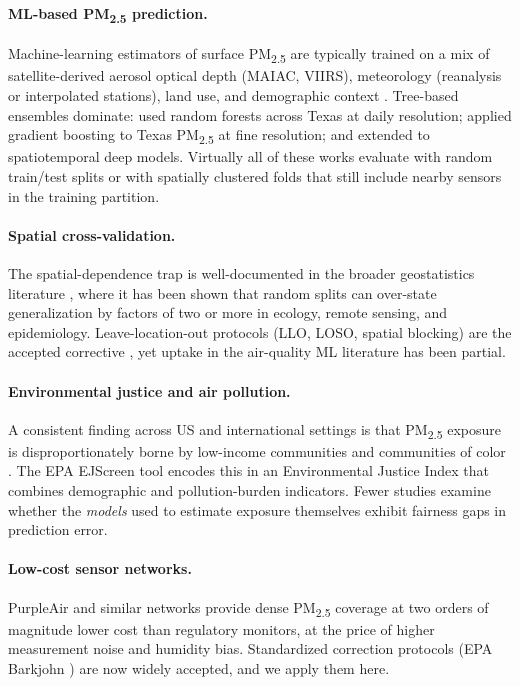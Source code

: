 \documentclass{article}
\begin{document}
\paragraph{ML-based PM\textsubscript{2.5} prediction.} Machine-learning estimators of surface PM\textsubscript{2.5} are typically trained on a mix of satellite-derived aerosol optical depth (MAIAC, VIIRS), meteorology (reanalysis or interpolated stations), land use, and demographic context \citep{hu2017estimating, park2020spatiotemporal}. Tree-based ensembles dominate: \citet{ghahremanloo2021} used random forests across Texas at daily resolution; \citet{zhang2024unmasking} applied gradient boosting to Texas PM\textsubscript{2.5} at fine resolution; \citet{just2018} and \citet{hough2021} extended to spatiotemporal deep models. Virtually all of these works evaluate with random train/test splits or with spatially clustered folds that still include nearby sensors in the training partition.

\paragraph{Spatial cross-validation.} The spatial-dependence trap is well-documented in the broader geostatistics literature \citep{roberts2017cross, meyer2019importance}, where it has been shown that random splits can over-state generalization by factors of two or more in ecology, remote sensing, and epidemiology. Leave-location-out protocols (LLO, LOSO, spatial blocking) are the accepted corrective \citep{pohjankukka2017}, yet uptake in the air-quality ML literature has been partial.

\paragraph{Environmental justice and air pollution.} A consistent finding across US and international settings is that PM\textsubscript{2.5} exposure is disproportionately borne by low-income communities and communities of color \citep{tessum2021pm25, jbaily2022air, colmer2020disparities}. The EPA EJScreen tool \citep{epa2022ejscreen} encodes this in an Environmental Justice Index that combines demographic and pollution-burden indicators. Fewer studies examine whether the \emph{models} used to estimate exposure themselves exhibit fairness gaps in prediction error.

\paragraph{Low-cost sensor networks.} PurpleAir and similar networks \citep{morawska2018} provide dense PM\textsubscript{2.5} coverage at two orders of magnitude lower cost than regulatory monitors, at the price of higher measurement noise and humidity bias. Standardized correction protocols (EPA Barkjohn \citep{barkjohn2021}) are now widely accepted, and we apply them here.
\end{document}

